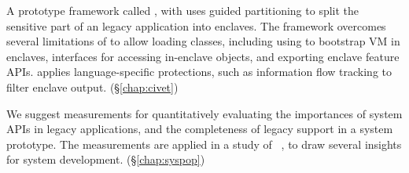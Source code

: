 \begin{compactitem}
\item A prototype framework called ,
with uses guided partitioning to split the sensitive part of an legacy \java{} application into \sgx{} enclaves.
The framework overcomes several limitations of \sgx{} to allow loading \java{} classes,
including using \graphene{} to bootstrap %
\java{} VM in enclaves,
interfaces for accessing in-enclave objects, %
and exporting enclave feature APIs.
\civet{} applies language-specific protections, %
such as information flow tracking to filter enclave output.
(\S\ref{chap:civet})

\item We suggest measurements for quantitatively evaluating the importances of system APIs in legacy applications,
and the completeness of legacy support in a system prototype.
The measurements are applied in a study of 
~\citep{tsai16apistudy},
to draw several insights for system development.
(\S\ref{chap:syspop})


\end{compactitem}

